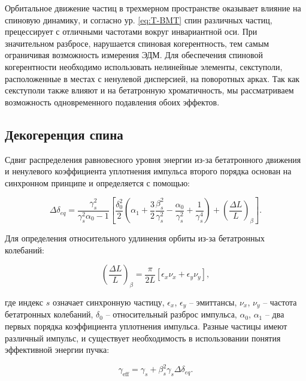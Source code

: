 \par Орбитальное движение частиц в трехмерном пространстве оказывает влияние на спиновую динамику, и согласно ур. \ref{eq:T-BMT} спин различных частиц, прецессирует с отличными частотами вокруг инвариантной оси. При значительном разбросе, нарушается спиновая когерентность, тем самым ограничивая возможность измерения ЭДМ. Для обеспечения спиновой когерентности необходимо использовать нелинейные элементы, секступоли, расположенные в местах с ненулевой дисперсией, на поворотных арках. Так как секступоли также влияют и на бетатронную хроматичность, мы рассматриваем возможность одновременного подавления обоих эффектов.

		\subsection{Декогеренция спина}\label{sec:EDM/Wien_filter_tracking/decoherence}

\par Сдвиг распределения равновесного уровня энергии из-за бетатронного движения и ненулевого коэффициента уплотнения импульса второго порядка основан на синхронном принципе \cite{Senichev:2013_decoherence} и определяется с помощью:

\begin{equation}
\Delta\delta_{eq}=\frac{\gamma_s^2}{\gamma_s^2\alpha_0-1}\left[\frac{\delta_0^2}{2}\left(\alpha_1+\frac{3}{2}\frac{\beta_s^2}{\gamma_s^2}-\frac{\alpha_0}{\gamma_s^2}+\frac{1}{\gamma_s^4}\right)+\left(\frac{\Delta L}{L}\right)_\beta\right].
\label{eq:equilibrium}
\end{equation}

\noindent Для определения относительного удлинения орбиты из-за бетатронных колебаний:

\begin{equation}
\left(\frac{\Delta L}{L}\right)_\beta=\frac{\pi}{2L}\left[\epsilon_x\nu_x+\epsilon_y\nu_y\right],
\end{equation}

\noindent где индекс $s$ означает синхронную частицу, $\epsilon_x$, $\epsilon_y$ – эмиттансы, $\nu_x$, $\nu_y$ – частота бетатронных колебаний, $\delta_0$ – относительный разброс импульса, $\alpha_0$, $\alpha_1$ – два первых порядка коэффициента уплотнения импульса. Разные частицы имеют различный импульс, и существует необходимость в использовании понятия эффективной энергии пучка:

\begin{equation}
	\gamma_{\text{eff}}=\gamma_s+\beta_s^2\gamma_s\Delta\delta_{eq}.
\end{equation}

